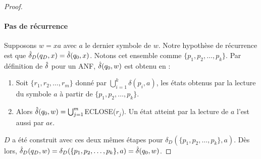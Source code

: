 \begin{proof}
	\paragraph{Pas de récurrence} Supposons $w=xa$ avec $a$ le dernier symbole de $w$. Notre hypothèse de récurrence est que $\hat{\delta}_D(q_D,x)=\hat{\delta}(q_0,x)$. Notons cet ensemble comme $\{p_1,p_2, \dots, p_k\}$. Par définition de $\hat{\delta}$ pour un ANF, $\hat{\delta}(q_0,w)$ est obtenu en :
	
	\begin{enumerate}
		\item Soit $\{r_1,r_2,\dots, r_m\}$ donné par $\bigcup_{i=1}^k \delta(p_i,a)$, les états obtenus par la lecture du symbole $a$ à partir de $\{p_1,p_2,\dots,p_k\}$.
		\item Alors $\hat{\delta}(q_0,w)=\bigcup_{j=1}^m$ECLOSE($r_j$). Un état atteint par la lecture de $a$ l'est aussi par $a\epsilon$.
	\end{enumerate}
	
	$D$ a été construit avec ces deux mêmes étapes pour $\delta_D(\{p_1,p_2,\dots, p_k\},a)$. Dès lors, $\hat{\delta}_D(q_D,w)=\delta_D(\{p_1,p_2,\dots, p_k\},a)=\hat{\delta}(q_0,w)$.	
	
\end{proof}



